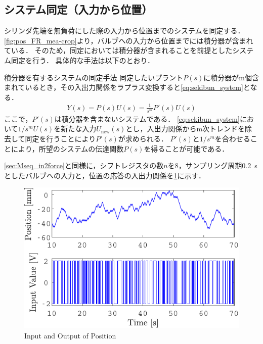 \subsection{システム同定（入力から位置）}
シリンダ先端を無負荷にした際の入力から位置までのシステムを同定する．
\figname\ref{fig:pos_FR_mea-crop}より，バルブへの入力から位置までには積分器が含まれている．
そのため，同定においては積分器が含まれることを前提としたシステム同定\cite{竹下侑2014積分器を有するシステムの同定について}を行う．
具体的な手法は以下のとおり．
\begin{itembox}[l]{積分器を有するシステムの同定手法}
    同定したいプラント$P(s)$に積分器がm個含まれているとき，その入出力関係をラプラス変換すると\eqnname\ref{eq:sekibun_system}となる．
    \begin{align}
        \label{eq:sekibun_system}
        Y(s) = P(s)U(s) = \frac{1}{s^m}P'(s)U(s)
    \end{align}
    ここで，$P'(s)$は積分器を含まないシステムである．
    \eqnname\ref{eq:sekibun_system}において${1}/{s^m}U(s)$を新たな入力$U_{\mathrm{new}}(s)$とし，入出力関係からm次トレンドを除去して同定を行うことにより$P'(s)$が求められる．
    $P'(s)$と$1/s^m$を合わせることにより，所望のシステムの伝達関数$P(s)$を得ることが可能である．
\end{itembox}
\ref{sec:Mseq_in2force}と同様に，シフトレジスタの数$n$を8，サンプリング周期\SI{0.2}{s}としたバルブへの入力と，位置の応答の入出力関係を\figname\ref{fig:crop-inputANDpos}に示す．
\begin{figure}[t]
    \centering
        \includegraphics[keepaspectratio, scale=1.0]{contents/システム同定/figure/crop-inputANDpos.pdf}
        \caption{Input and Output of Position}
        \label{fig:crop-inputANDpos}
\end{figure}







































